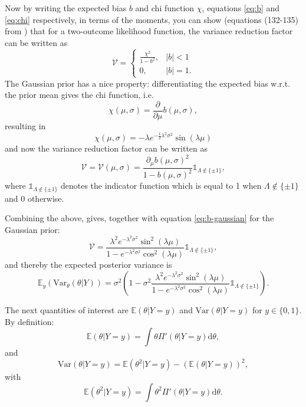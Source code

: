 \documentclass[]{report}
\begin{document}
Now by writing the expected bias $b$ and chi function $\chi$, equations \eqref{eq:b} and \eqref{eq:chi} respectively, in terms of the moments, you can show (equations (132-135) from \cite{Koh2020}) that for a two-outcome likelihood function, the variance reduction factor can be written as
\begin{equation}
    \mathcal{V} = \begin{cases}
        \frac{\chi^2}{1-b^2},   & |b|<1\\
        0,                      & |b|=1.
    \end{cases}
\end{equation}
The Gaussian prior has a nice property: differentiating the expected bias w.r.t. the prior mean gives the chi function, i.e.
\begin{equation}
\label{eq:chi-diff}
    \chi(\mu, \sigma) = \frac{\partial}{\partial\mu}b(\mu, \sigma),
\end{equation}
resulting in
\begin{equation}
\label{eq:chi-gaussian}
    \chi(\mu, \sigma) = - \lambda e^{-\frac{1}{2}\lambda^2\sigma^2}\sin(\lambda\mu)
\end{equation}
and now the variance reduction factor can be written as
\begin{equation}
    \mathcal{V} = \mathcal{V}(\mu, \sigma) = \frac{\partial_{\mu}b(\mu, \sigma)^2}{1 - b(\mu, \sigma)^2} \mathbb{1}_{\Lambda \notin \{\pm1\}},
\end{equation}
where $\mathbb{1}_{\Lambda \notin \{\pm1\}}$ denotes the indicator function which is equal to 1 when $\Lambda \notin \{\pm1\}$ and $0$ otherwise.

Combining the above, gives, together with equation \eqref{eq:b-gaussian} for the Gaussian prior:
\begin{equation}
    \mathcal{V} = \frac{\lambda^2 e^{-\lambda^2\sigma^2} \sin^2(\lambda\mu)}{1-e^{-\lambda^2\sigma^2} \cos^2(\lambda\mu)}\mathbb{1}_{\Lambda \notin \{\pm1\}},
\end{equation}
and thereby the expected posterior variance is
\begin{equation}
    \mathbb{E}_y(\text{Var}_{\theta}(\theta | Y)) = \sigma^2(1-\sigma^2\frac{\lambda^2 e^{-\lambda^2\sigma^2} \sin^2(\lambda\mu)}{1-e^{-\lambda^2\sigma^2} \cos^2(\lambda\mu)}\mathbb{1}_{\Lambda \notin \{\pm1\}}).
\end{equation}

The next quantities of interest are $\mathbb{E}(\theta | Y=y)$ and $\text{Var}(\theta|Y=y)$ for $y\in \{0,1\}$. By definition:
\begin{equation}
    \mathbb{E}(\theta | Y=y) = \int \theta \Pi'(\theta|Y=y)\text{d}\theta,
\end{equation}
and
\begin{equation}
    \text{Var}(\theta|Y=y) = \mathbb{E}(\theta^2 | Y=y) - (\mathbb{E}(\theta | Y=y))^2,
\end{equation}
with
\begin{equation}
    \mathbb{E}(\theta^2 | Y=y) = \int \theta^2 \Pi'(\theta|Y=y)\text{d}\theta.
\end{equation}
\end{document}
